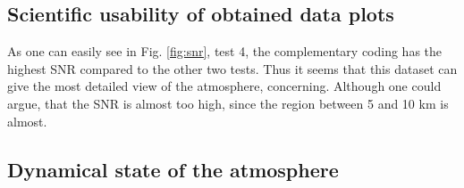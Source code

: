 \subsection{Scientific usability of obtained data plots}
As one can easily see in Fig. \ref{fig:snr}, test 4, the complementary coding has the highest SNR compared to the other two tests. Thus it seems that this dataset can give the most detailed view of the atmosphere, concerning.
Although one could argue, that the SNR is almost too high, since the region between 5 and 10 km is almost. 
\subsection{Dynamical state of the atmosphere}









